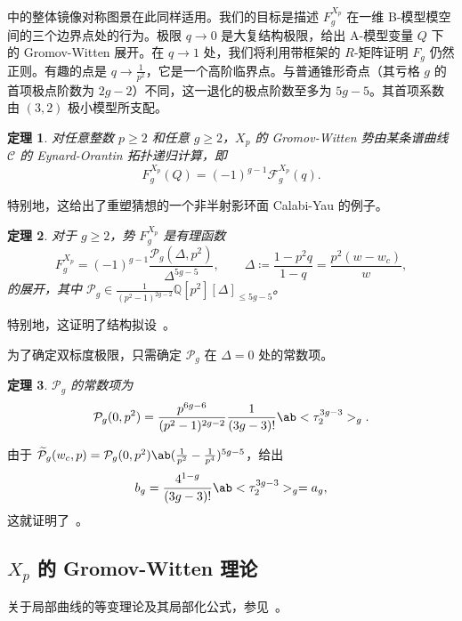 \documentclass{amsart}
\newtheorem{thm}{定理}[section]
\theoremstyle{definition}
\theoremstyle{remark}
\theoremstyle{plain}
\theoremstyle{definition}
\theoremstyle{remark}
\newcommand{\Q}{\mathbb{Q}}
\newcommand{\mc}[1]{\mathcal{#1}}
\newcommand{\wt}[1]{\widetilde{#1}}
\newcommand{\1}{\mathbf{1}}
\newcommand{\2}{\mathbf{2}}
\newcommand{\3}{\mathbf{3}}
\begin{document}
中的整体镜像对称图景在此同样适用。我们的目标是描述 \(F_g^{X_p}\) 在一维 B-模型模空间的三个边界点处的行为。极限 \(q \to 0\) 是大复结构极限，给出 A-模型变量 \(Q\) 下的 Gromov-Witten 展开。在 \(q \to 1\) 处，我们将利用带框架的 \(R\)-矩阵证明 \(F_g\) 仍然正则。有趣的点是 \(q \to \frac{1}{p^2}\)，它是一个高阶临界点。与普通锥形奇点（其亏格 \(g\) 的首项极点阶数为 \(2g-2\)）不同，这一退化的极点阶数至多为 \(5g-5\)。其首项系数由 \((3,2)\) 极小模型所支配。

\begin{thm}%
\label{thm:local P1 mirror symmetry}
    对任意整数 \(p \geq 2\) 和任意 \(g \geq 2\)，\(X_p\) 的 Gromov-Witten 势由某条谱曲线 \(\mc{C}\) 的 Eynard-Orantin 拓扑递归计算，即
    \[ F_g^{X_p}(Q) = (-1)^{g-1}\mc{F}_g^{X_p}(q). \]
\end{thm}

特别地，这给出了重塑猜想的一个非半射影环面 Calabi-Yau 的例子。

\begin{thm}%
\label{thm:local P1 rationality}
    对于 \(g \geq 2\)，势 \(F_g^{X_p}\) 是有理函数
    \[ F_g^{X_p} = (-1)^{g-1}\frac{\mc{P}_g(\Delta,p^2)}{\Delta^{5g-5}}, \qquad \Delta \coloneqq \frac{1-p^2q}{1-q} = \frac{p^2(w-w_c)}{w}, \]
    的展开，其中 \(\mc{P}_g \in \frac{1}{(p^2-1)^{2g-2}}\Q[p^2][\Delta]_{\leq 5g-5}\)。
\end{thm}

特别地，这证明了结构拟设~。

为了确定双标度极限，只需确定 \(\mc{P}_g\) 在 \(\Delta = 0\) 处的常数项。

\begin{thm}%
\label{thm:local P1 constant term}
    \(\mc{P}_g\) 的常数项为
    \[ \mc{P}_g(0,p^2) = \frac{p^{6g-6}}{(p^2-1)^{2g-2}}\frac{1}{(3g-3)!}\ab<\tau_2^{3g-3}>_g. \]
\end{thm}

由于 \(\wt{\mc{P}}_g(w_c,p) = \mc{P}_g(0,p^2)\ab(\frac{1}{p^2}-\frac{1}{p^4})^{5g-5}\)，给出
\[ b_g = \frac{4^{1-g}}{(3g-3)!}\ab<\tau_2^{3g-3}>_g = a_g, \]
这就证明了~。

\subsection{\(X_p\) 的 Gromov-Witten 理论}%
\label{sub:Gromov-Witten theory of Xp}

关于局部曲线的等变理论及其局部化公式，参见~\cite{BryanPandharipande2008}。
\end{document}
